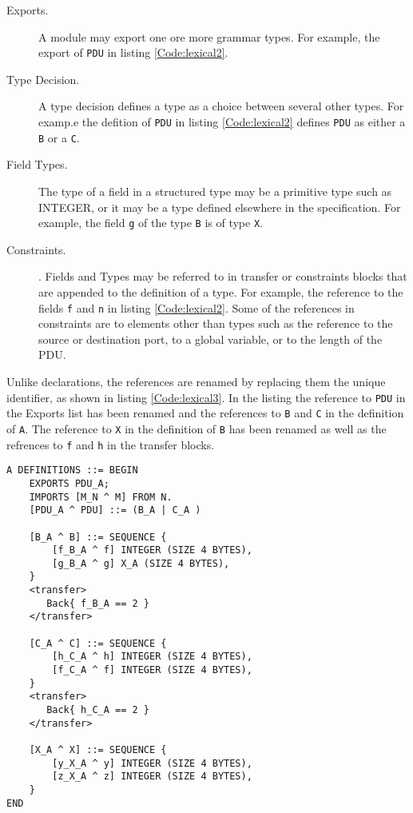 \documentclass[12pt,oneside,letterpaper]{article}
\begin{document}

\begin{description}
    \item[Exports.] A module may export one ore more grammar types. For example, the export of \texttt{PDU} in listing \ref{Code:lexical2}. 
    
    \item[Type Decision.] A type decision defines a type as a choice between several other types. For examp.e the defition of \texttt{PDU} in listing \ref{Code:lexical2} defines \texttt{PDU} as either a \texttt{B} or a \texttt{C}.
    
    \item[Field Types.] The type of a field in a structured type may be a primitive type such as INTEGER, or it may be a type defined elsewhere in the specification. For example, the field \texttt{g} of the type \texttt{B} is of type \texttt{X}.
    
    \item[Constraints.]. Fields and Types may be referred to in transfer or constraints blocks that are appended to the definition of a type. For example, the reference to the fields \texttt{f} and \texttt{n} in listing \ref{Code:lexical2}. Some of the references in constraints are to elements other than types such as the reference to the source or destination port, to a global variable, or to the length of the PDU.
\end{description}

Unlike declarations, the references are renamed by replacing them the unique identifier, as shown in listing \ref{Code:lexical3}. In the listing the reference to \texttt{PDU} in the Exports list has been renamed and the references to \texttt{B} and \texttt{C} in the definition of \texttt{A}. The reference to \texttt{X} in the definition of \texttt{B} has been renamed as well as the refrences to \texttt{f} and \texttt{h} in the transfer blocks.

\begin{lstlisting}[language=SCL2,style=mystyle,frame=none,
caption=Rename References,label=Code:lexical3, xleftmargin=3.5ex, extendedchars=true]
A DEFINITIONS ::= BEGIN
    EXPORTS PDU_A;
    IMPORTS [M_N ^ M] FROM N.
    [PDU_A ^ PDU] ::= (B_A | C_A )
    
    [B_A ^ B] ::= SEQUENCE {
        [f_B_A ^ f] INTEGER (SIZE 4 BYTES),
        [g_B_A ^ g] X_A (SIZE 4 BYTES),
    }
    <transfer>
       Back{ f_B_A == 2 }
    </transfer>
    
    [C_A ^ C] ::= SEQUENCE {
        [h_C_A ^ h] INTEGER (SIZE 4 BYTES),
        [f_C_A ^ f] INTEGER (SIZE 4 BYTES),
    }
    <transfer>
       Back{ h_C_A == 2 }
    </transfer>
    
    [X_A ^ X] ::= SEQUENCE {
        [y_X_A ^ y] INTEGER (SIZE 4 BYTES),
        [z_X_A ^ z] INTEGER (SIZE 4 BYTES),
    }
END
\end{lstlisting}
\end{document}
